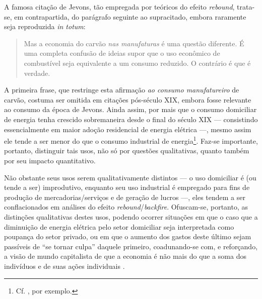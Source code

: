 A famosa citação de Jevons, tão empregada por teóricos do efeito \textit{rebound}, trata-se, em contrapartida, do parágrafo seguinte ao supracitado, embora raramente seja reproduzida \textit{in totum}: 
\begin{quote}
    Mas a economia do carvão \textit{nas manufaturas} é uma questão diferente. É uma completa confusão de ideias supor que o uso econômico de combustível seja equivalente a um consumo reduzido. O contrário é que é verdade. \cite[p. 75, grifo meu]{Jevons1866}
\end{quote}

A primeira frase, que restringe esta afirmação \textit{ao consumo manufatureiro} de carvão, costuma ser omitida em citações pós-século XIX, embora fosse relevante ao consumo da época de Jevons. Ainda assim, por mais que o consumo domiciliar de energia tenha crescido sobremaneira desde o final do século XIX --- consistindo essencialmente em maior adoção residencial de energia elétrica  ---, mesmo assim ele tende a ser menor do que o consumo industrial de energia\footnote{Cf. \textcite{USEnergyInformation}, por exemplo.}. Faz-se importante, portanto, distinguir tais usos, não só por questões qualitativas, quanto também por seu impacto quantitativo.

Não obstante seus usos serem qualitativamente distintos --- o uso domiciliar é (ou tende a ser) improdutivo, enquanto seu uso industrial é empregado para fins de produção de mercadorias/serviços e de geração de lucros ---, eles tendem a ser conflacionados em análises do efeito \textit{rebound}/\textit{backfire}. Ofuscam-se, portanto, as distinções qualitativas destes usos, podendo ocorrer situações em que o caso que a diminuição de energia elétrica pelo setor domiciliar seja interpretada como poupança do setor privado, ou em que o aumento dos gastos deste último sejam passíveis de ``se tornar culpa'' daquele primeiro, coadunando-se com, e reforçando, a visão de mundo capitalista de que a economia é não mais do que a soma dos indivíduos e de suas ações individuais \parencite{Medeiros2013}. 



